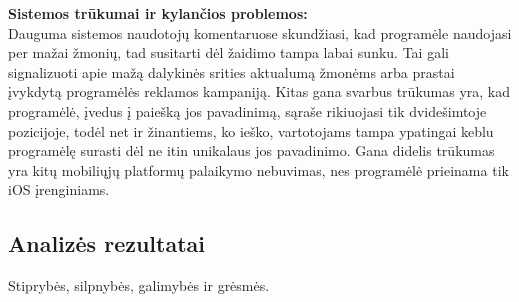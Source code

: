\documentclass{VUMIFPSkursinis}
\begin{document}
			\textbf{Sistemos trūkumai ir kylančios problemos:}\\
			Dauguma sistemos naudotojų komentaruose skundžiasi, kad programėle 
			naudojasi per mažai žmonių, tad susitarti dėl žaidimo tampa labai sunku. 
			Tai gali signalizuoti apie mažą dalykinės srities aktualumą žmonėms arba
			prastai įvykdytą programėlės reklamos kampaniją. Kitas gana svarbus 
			trūkumas yra, kad programėlė, įvedus į paiešką jos pavadinimą, sąraše 
			rikiuojasi tik dvidešimtoje pozicijoje, todėl net ir žinantiems, ko 
			ieško, vartotojams tampa ypatingai keblu programėlę surasti dėl ne itin 
			unikalaus jos pavadinimo. Gana didelis trūkumas yra kitų mobiliųjų 
			platformų palaikymo nebuvimas, nes programėlė prieinama tik iOS įrenginiams.

		\subsection{Analizės rezultatai}
			Stiprybės, silpnybės, galimybės ir grėsmės.		
\end{document}
